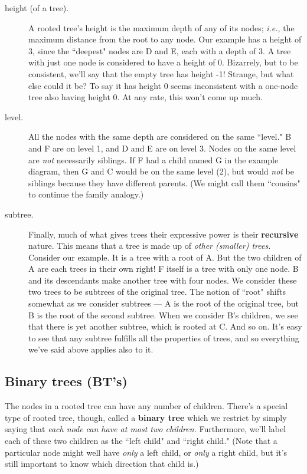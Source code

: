 \begin{description}
\item[height (of a tree).] A rooted tree's height is the maximum depth of
any of its nodes; \textit{i.e.}, the maximum distance from the root to any
node. Our example has a height of 3, since the ``deepest" nodes are D and
E, each with a depth of 3. A tree with just one node is considered to have
a height of 0. Bizarrely, but to be consistent, we'll say that the empty
tree has height -1! Strange, but what else could it be? To say it has
height 0 seems inconsistent with a one-node tree also having height 0. At
any rate, this won't come up much.

\item[level.] All the nodes with the same depth are considered on the same
``level." B and F are on level 1, and D and E are on level 3. Nodes on the
same level are \textit{not} necessarily siblings. If F had a child named G
in the example diagram, then G and C would be on the same level (2), but
would \textit{not} be siblings because they have different parents. (We
might call them ``cousins" to continue the family analogy.)

\item[subtree.] \label{recursion} Finally, much of what gives trees their
expressive power is their \textbf{recursive} nature. This means that a tree
is made up of \textit{other (smaller) trees.} Consider our example. It is a
tree with a root of A. But the two children of A are each trees in their
own right! F itself is a tree with only one node. B and its descendants
make another tree with four nodes. We consider these two trees to be
subtrees of the original tree. The notion of ``root" shifts somewhat as we
consider subtrees --- A is the root of the original tree, but B is the root
of the second subtree. When we consider B's children, we see that there is
yet another subtree, which is rooted at C. And so on. It's easy to see that
any subtree fulfills all the properties of trees, and so everything we've
said above applies also to it.

\end{description}

\subsection{Binary trees (BT's)}

The nodes in a rooted tree can have any number of children. There's a
special type of rooted tree, though, called a \textbf{binary tree} which we
restrict by simply saying that \textit{each node can have at most two
children.} Furthermore, we'll label each of these two children as the
``left child" and ``right child." (Note that a particular node might well
have \textit{only} a left child, or \textit{only} a right child, but it's
still important to know which direction that child is.)

